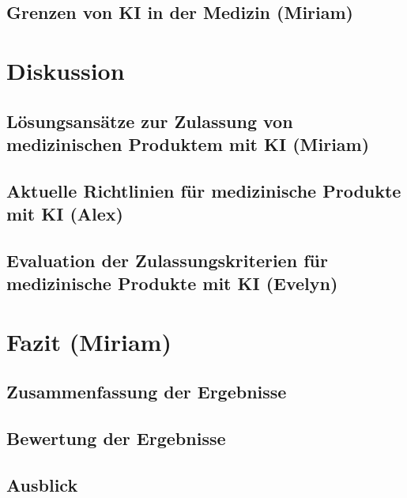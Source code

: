 \documentclass[a4paper, 11pt]{article}
\begin{document}
			\subsection{Grenzen von KI in der Medizin  \small{(Miriam)}}\label{sec:ki-limitations}
				
	\newpage
	\section{Diskussion}\label{sec:discussion}
		
		\subsection{Lösungsansätze zur Zulassung von medizinischen Produktem mit KI  \small{(Miriam)}} \label{sec:solutions}
			
		\subsection{Aktuelle Richtlinien für medizinische Produkte mit KI \small{(Alex)}}\label{sec:guidlines}
			
		\subsection{Evaluation der Zulassungskriterien für medizinische Produkte mit KI \small{(Evelyn)}}\label{sec:sufficient-criteria}
			
		
	
	\newpage
	\section{Fazit \small{(Miriam)}}\label{sec:conclusion}
		
		\subsection{Zusammenfassung der Ergebnisse}\label{sec:summary}
			
		\subsection{Bewertung der Ergebnisse}\label{sec:rating}
			
		\subsection{Ausblick}\label{sec:perspective}
			
	  

    \newpage
    \printglossary[type=\acronymtype,title={Akronyme}]
   
    \newpage
    \nocite{*}
    \printbibliography{}
	
    \newpage
    \printglossary[type=main,title={Glossar}]
\end{document}
